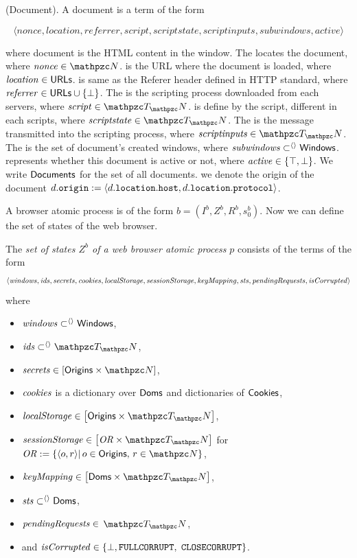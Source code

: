 \begin{definition}(Document).
A document  is a term of the form

$$\langle nonce, location, referrer, script, scriptstate, scriptinputs, subwindows, active \rangle $$

where document is the HTML content in the window.  
The  locates the document, where $\mi{nonce} \in \nonces$. 
 is the URL where the document is loaded, where $\mathit{location} \in \mathsf{URLs}$. 
 is same as the Referer header defined in HTTP standard, where $\mathit{referrer} \in \mathsf{URLs} \cup \{\bot\}$. 
The  is the scripting process downloaded from each servers, where $\mi{script} \in \terms$. 
 is define by the script, different in each scripts, where $\mi{scriptstate} \in \terms$. 
The  is the message transmitted into the scripting process, where $\mi{scriptinputs} \in \terms$. 
The  is the set of document's created windows, where $\mathit{subwindows} \subset^{\langle\rangle} \mathsf{Windows}$. 
 represents whether this document is active or not, where $\mathit{active} \in \{\top, \bot\}$.
We write $\mathsf{Documents}$ for the set of all documents.
we denote the origin of the document $d.\mathtt{origin} := \langle d.\mathtt{location}.\mathtt{host}, d.\mathtt{location}.\mathtt{protocol}\rangle$.
\end{definition}

A browser atomic process is of the form $b = (I^b, Z^b, R^b, s_0^b)$.
Now we can define the set of states of the web browser.
\begin{definition}
The
  \emph{set of states $Z^b$ of a web browser atomic process}
  $p$ consists of the terms of the form
  \begin{align*} \langle\mathit{windows}, \mathit{ids},
    \mathit{secrets}, \mathit{cookies}, \mathit{localStorage},
    \mathit{sessionStorage}, \mathit{keyMapping}, \mathit{sts},
    \mathit{pendingRequests}, \mathit{isCorrupted}\rangle
  \end{align*} where
  \begin{itemize}
  \item $\mathit{windows} \subset^{\langle\rangle} \mathsf{Windows}$,
  \item $\mi{ids} \subsetPairing \terms$,
  \item $\mi{secrets} \in \dict{\origins}{\nonces}$,
  \item $\mathit{cookies}$ is a dictionary over $\mathsf{Doms}$ and
    dictionaries of $\mathsf{Cookies}$,
  \item $\mi{localStorage} \in \dict{\origins}{\terms}$,
  \item $\mi{sessionStorage} \in \dict{\mi{OR}}{\terms}$ for $\mi{OR} := \left\{\an{o,r}
    \middle|\, o \in \origins,\, r \in \nonces\right\}$,
  \item $\mi{keyMapping} \in \dict{\dns}{\terms}$,
  \item $\mathit{sts} \subset^{\langle\rangle} \mathsf{Doms}$,
  \item $\mathit{pendingRequests} \in$ $\terms$,
  \item and $\mathit{isCorrupted} \in \{\bot, \mathtt{FULLCORRUPT},$ $
    \mathtt{CLOSECORRUPT}\}$.
  \end{itemize} 
\end{definition}



